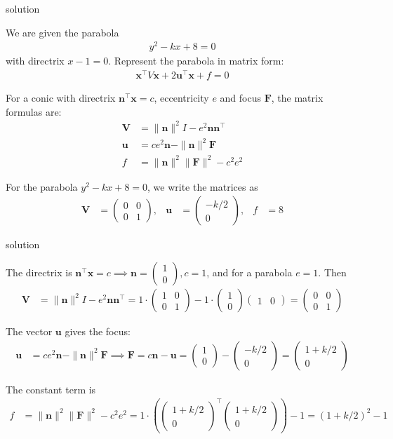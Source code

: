 \documentclass{beamer}
\numberwithin{equation}{section}
\theoremstyle{remark}
\newcommand{\myvec}[1]{\ensuremath{\begin{pmatrix}#1\end{pmatrix}}}
\let\vec\mathbf
\begin{document}
\begin{frame}{solution}

We are given the parabola 
\begin{align}
y^2 - kx + 8 = 0
\end{align}
with directrix \(x - 1 = 0\). Represent the parabola in matrix form:
\begin{align}
\vec{x}^\top V \vec{x} + 2 \vec{u}^\top \vec{x} + f = 0
\end{align}



For a conic with directrix \(\vec{n}^\top \vec{x} = c\), eccentricity \(e\) and focus \(\vec{F}\), the matrix formulas are:
\begin{align}
\vec{V} &= \|\vec{n}\|^2 I - e^2 \vec{n} \vec{n}^\top \\
\vec{u} &= c e^2 \vec{n} - \|\vec{n}\|^2 \vec{F} \\
f &= \|\vec{n}\|^2 \|\vec{F}\|^2 - c^2 e^2
\end{align}

For the parabola \(y^2 - kx + 8 = 0\), we write the matrices as
\begin{align}
\vec{V} &= \myvec{0 & 0 \\ 0 & 1}, &
\vec{u} &= \myvec{-k/2 \\ 0}, &
f &= 8
\end{align}
\end{frame}
\begin{frame}{solution}

The directrix is \(\vec{n}^\top \vec{x} = c \implies \vec{n} = \myvec{1 \\ 0}, c = 1\), and for a parabola \(e = 1\). Then
\begin{align}
\vec{V} &= \|\vec{n}\|^2 I - e^2 \vec{n} \vec{n}^\top 
= 1 \cdot \myvec{1 & 0 \\ 0 & 1} - 1 \cdot \myvec{1\\0} \myvec{1 & 0} 
= \myvec{0 & 0 \\ 0 & 1}
\end{align}

The vector \(\vec{u}\) gives the focus:
\begin{align}
\vec{u} &= c e^2 \vec{n} - \|\vec{n}\|^2 \vec{F} \implies
\vec{F} = c \vec{n} - \vec{u} = \myvec{1 \\ 0} - \myvec{-k/2 \\ 0} = \myvec{1 + k/2 \\ 0}
\end{align}

The constant term is
\begin{align}
f &= \|\vec{n}\|^2 \|\vec{F}\|^2 - c^2 e^2 
= 1 \cdot \left( \myvec{1 + k/2 \\ 0}^\top \myvec{1 + k/2 \\ 0} \right) - 1 
= (1 + k/2)^2 - 1
\end{align}
\end{frame}
\end{document}
